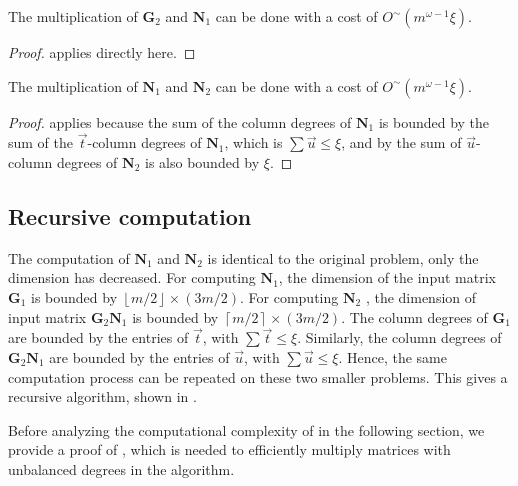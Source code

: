 \begin{lem}
\label{lem:mutiplyingG2N1}The multiplication of $\mathbf{G}_{2}$
and $\mathbf{N}_{1}$ can be done with a cost of $O^{\sim}(m^{\omega-1}\xi)$.\end{lem}
\begin{proof}
 applies directly here.\end{proof}
\begin{lem}
\label{lem:multiplyingN1N2}The multiplication of $\mathbf{N}_{1}$
and $\mathbf{N}_{2}$ can be done with a cost of $O^{\sim}(m^{\omega-1}\xi)$.\end{lem}
\begin{proof}
 applies because the sum
of the column degrees of $\mathbf{N}_{1}$ is bounded by the sum of
the $\vec{t}$-column degrees of $\mathbf{N}_{1}$, which is $\sum\vec{u}\le\xi$,
and by  the
sum of $\vec{u}$-column degrees of $\mathbf{N}_{2}$ is also bounded
by $\xi$. 
\end{proof}

\subsection{Recursive computation}

The computation of $\mathbf{N}_{1}$ and $\mathbf{N}_{2}$ is identical
to the original problem, only the dimension has decreased. For computing
$\mathbf{N}_{1}$, the dimension of the input matrix $\mathbf{G}_{1}$
is bounded by $\left\lfloor m/2\right\rfloor \times\left(3m/2\right)$.
For computing $\mathbf{N}_{2}$ , the dimension of input matrix $\mathbf{G}_{2}\mathbf{N}_{1}$
is bounded by $\left\lceil m/2\right\rceil \times(3m/2)$. The column
degrees of $\mathbf{G}_{1}$ are bounded by the entries of $\vec{t}$,
with $\sum\vec{t}\le\xi$. Similarly, the column degrees of $\mathbf{G}_{2}\mathbf{N}_{1}$
are bounded by the entries of $\vec{u}$, with $\sum\vec{u}\le\xi$.
Hence, the same computation process can be repeated on these two smaller
problems. This gives a recursive algorithm, shown in .



Before analyzing the computational complexity of 
in the following section, we provide a proof of ,
which is needed to efficiently multiply matrices with unbalanced degrees
in the algorithm.

